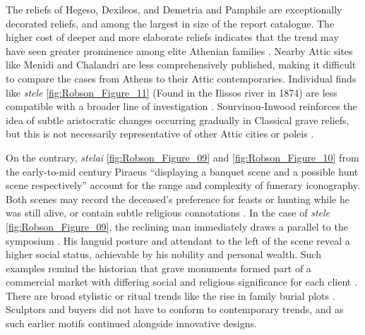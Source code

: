 The reliefs of Hegeso, Dexileos, and Demetria and Pamphile are exceptionally decorated reliefs, and among the largest in size of the report catalogue. The higher cost of deeper and more elaborate reliefs indicates that the trend may have seen greater prominence among elite Athenian families \parencite[54]{Sourvinouinwood1995b}.
Nearby Attic sites like Menidi and Chalandri are less comprehensively published, making it difficult to compare the cases from Athens to their Attic contemporaries.
Individual finds like \textit{stele} \ref{fig:Robson_Figure_11} (Found in the Ilissos river in 1874) are less compatible with a broader line of investigation \parencite[218]{Frederiksen2011}.
Sourvinou-Inwood reinforces the idea of subtle aristocratic changes occurring gradually in Classical grave reliefs, but this is not necessarily representative of other Attic cities or poleis \parencite[416]{Sourvinouinwood1995a}.

On the contrary, \textit{stelai} \ref{fig:Robson_Figure_09} and \ref{fig:Robson_Figure_10} from the early-to-mid  century \BC Piraeus
\enquote{displaying a banquet scene and a possible hunt scene respectively}
 account for the range and complexity of funerary iconography.
Both scenes may record the deceased’s preference for feasts or hunting while he was still alive, or contain subtle religious connotations \parencite[187]{Stamatopoulou1999}.
In the case of \textit{stele} \ref{fig:Robson_Figure_09}, the reclining man immediately draws a parallel to the symposium \parencite[186]{Stamatopoulou1999}.
His languid posture and attendant to the left of the scene reveal a higher social status, achievable by his nobility and personal wealth. Such examples remind the historian that grave monuments formed part of a commercial market with differing social and religious significance for each client \parencite[175]{Stewart1990}.
There are broad stylistic or ritual trends like the rise in family burial plots \parencite[164]{Camp2001}. Sculptors and buyers did not have to conform to contemporary trends, and as such earlier motifs continued alongside innovative designs.


